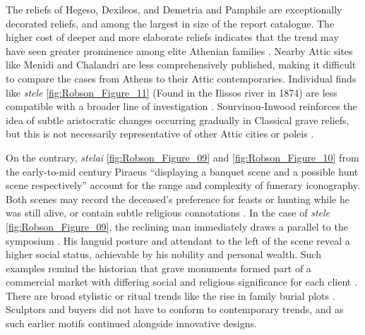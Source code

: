 The reliefs of Hegeso, Dexileos, and Demetria and Pamphile are exceptionally decorated reliefs, and among the largest in size of the report catalogue. The higher cost of deeper and more elaborate reliefs indicates that the trend may have seen greater prominence among elite Athenian families \parencite[54]{Sourvinouinwood1995b}.
Nearby Attic sites like Menidi and Chalandri are less comprehensively published, making it difficult to compare the cases from Athens to their Attic contemporaries.
Individual finds like \textit{stele} \ref{fig:Robson_Figure_11} (Found in the Ilissos river in 1874) are less compatible with a broader line of investigation \parencite[218]{Frederiksen2011}.
Sourvinou-Inwood reinforces the idea of subtle aristocratic changes occurring gradually in Classical grave reliefs, but this is not necessarily representative of other Attic cities or poleis \parencite[416]{Sourvinouinwood1995a}.

On the contrary, \textit{stelai} \ref{fig:Robson_Figure_09} and \ref{fig:Robson_Figure_10} from the early-to-mid  century \BC Piraeus
\enquote{displaying a banquet scene and a possible hunt scene respectively}
 account for the range and complexity of funerary iconography.
Both scenes may record the deceased’s preference for feasts or hunting while he was still alive, or contain subtle religious connotations \parencite[187]{Stamatopoulou1999}.
In the case of \textit{stele} \ref{fig:Robson_Figure_09}, the reclining man immediately draws a parallel to the symposium \parencite[186]{Stamatopoulou1999}.
His languid posture and attendant to the left of the scene reveal a higher social status, achievable by his nobility and personal wealth. Such examples remind the historian that grave monuments formed part of a commercial market with differing social and religious significance for each client \parencite[175]{Stewart1990}.
There are broad stylistic or ritual trends like the rise in family burial plots \parencite[164]{Camp2001}. Sculptors and buyers did not have to conform to contemporary trends, and as such earlier motifs continued alongside innovative designs.


